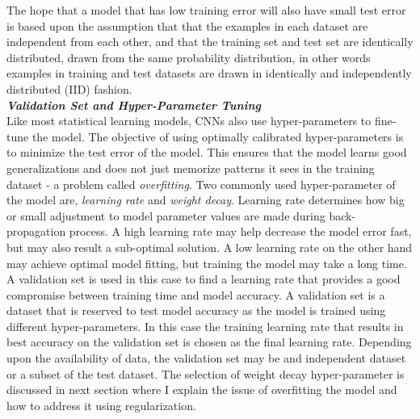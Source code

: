 \documentclass [11pt,letterpaper ,twoside ,openany ]{report}
\begin{document}
    The hope that a model that has low training error will also have small test error is based upon the assumption that that the examples in each dataset are independent from each other, and that the training set and test set are identically distributed, drawn from the same probability distribution, in other words examples in training and test datasets are drawn in identically and independently distributed (IID) fashion.\\

    
    \noindent
    \textbf{\textit{Validation Set and Hyper-Parameter Tuning}}\\
    Like most statistical learning models, CNNs also use hyper-parameters to fine-tune the model. The objective of using optimally calibrated hyper-parameters is to minimize the test error of the model. This ensures that the model learns good generalizations and does not just memorize patterns it sees in the training dataset - a problem called \textit{overfitting}. Two commonly used hyper-parameter of the model are, \textit{learning rate} and \textit{weight decay}. Learning rate determines how big or small adjustment to model parameter values are made during back-propagation process. A high learning rate may help decrease the model error fast, but may also result a sub-optimal solution. A low learning rate on the other hand may achieve optimal model fitting, but training the model may take a long time. A validation set is used in this case to find a learning rate that provides a good compromise between training time and model accuracy. A validation set is a dataset that is reserved to test model accuracy as the model is trained using different hyper-parameters. In this case the training learning rate that results in best accuracy on the validation set is chosen as the final learning rate. Depending upon the availability of data, the validation set may be and independent dataset or a subset of the test dataset. The selection of weight decay hyper-parameter is discussed in next section where I explain the issue of overfitting the model and how to address it using regularization.\\
\end{document}
